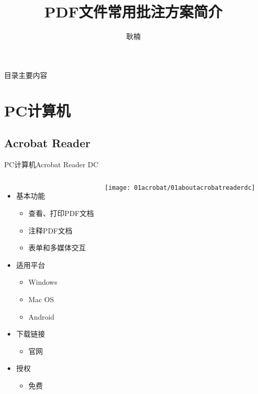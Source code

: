 \documentclass[fontset = none, t, aspectratio=169]{ctexbeamer}
\title[pdfReview]{\Large PDF文件常用批注方案简介}
\author[N. Geng]{耿楠}
\date{\tosemester} %
\institute[教发中心]{教学发展中心\\西北农林科技大学}
\begin{document}
\begin{frame}
  \maketitle
\end{frame}


\begin{frame}{目录}{主要内容}
  \begin{multicols}{2}
    \tableofcontents
  \end{multicols}  
\end{frame}

\section{PC计算机}
\subsection{Acrobat Reader}
\begin{frame}{PC计算机}{Acrobat Reader DC}
  \begin{columns}[c]
    \begin{itemize}
    \item 基本功能
      \begin{itemize}
      \item 查看、打印PDF文档
      \item \alert{注释}PDF文档
      \item 表单和多媒体交互
      \end{itemize}
    \item 适用平台
      \begin{itemize}
      \item Windows
      \item Mac OS
      \item Android
      \end{itemize}
    \item 下载链接
      \begin{itemize}
      \item 官网
      \end{itemize}
    \item 授权
      \begin{itemize}
      \item \alert{免费}
      \end{itemize}
    \end{itemize}
    \texttt{[image: 01acrobat/01aboutacrobatreaderdc]}
  \end{columns}
\end{frame}
\end{document}
